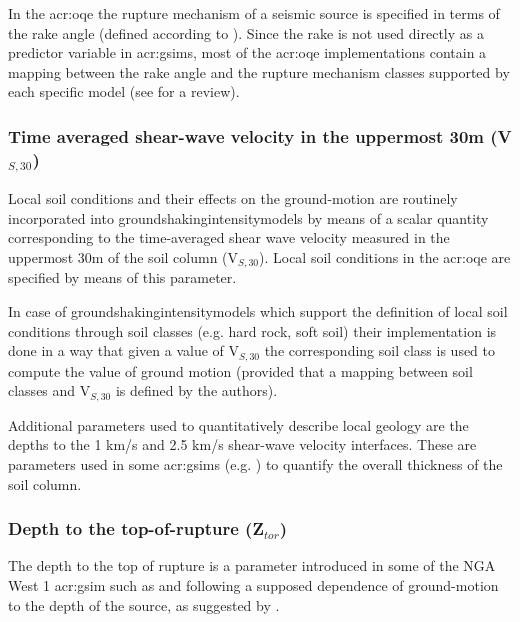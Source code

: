 In the \gls{acr:oqe} the rupture mechanism of a seismic source is specified 
in terms of the rake angle (defined according to \cite{aki2002}). 
%
Since the rake is not used directly as a predictor variable in 
\glspl{acr:gsim}, most of the \gls{acr:oqe} implementations contain a mapping
between the rake angle and the rupture mechanism classes supported by each
specific model (see \cite[page 24 of][]{akkar2013r} for a review).
%
\subsubsection{Time averaged shear-wave velocity in the uppermost 30m 
(V$_{S,30}$)}
%
Local soil conditions and their effects on the ground-motion are routinely 
incorporated into \glspl{groundshakingintensitymodel} by means of a scalar
quantity corresponding to the time-averaged shear wave velocity measured 
in the uppermost 30m of the soil column (V$_{S,30}$).
%
Local soil conditions in the \gls{acr:oqe} are specified by means of this
parameter.

In case of \glspl{groundshakingintensitymodel} which support the definition 
of local soil conditions through soil classes (e.g. hard rock, soft soil) 
their implementation is done in a way that given a value of V$_{S,30}$ the
corresponding soil class is used to compute the value of ground motion 
(provided that a mapping between soil classes and V$_{S,30}$ is defined 
by the authors).

Additional parameters used to quantitatively describe local geology are 
the depths to the 1 km/s and 2.5 km/s shear-wave velocity interfaces. 
These are parameters used in some \glspl{acr:gsim} (e.g. \cite{chiou2008}) 
to quantify the overall thickness of the soil column. 
%
\subsubsection{Depth to the top-of-rupture (Z$_{tor}$)}
The depth to the top of rupture is a parameter introduced in some of the NGA
West 1 \gls{acr:gsim} such as \textcite{chiou2008} and \textcite{abrahamson2008}
following a supposed dependence of ground-motion to the depth of the source,
as suggested by \textcite{somerville2006a}.
%
